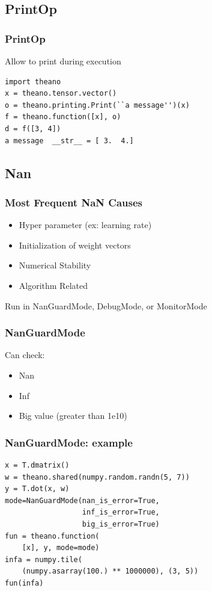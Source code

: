 \documentclass[utf8x,xcolor=pdftex,dvipsnames,table]{beamer}
\begin{document}
\subsection{PrintOp}
\begin{frame}[fragile]
  \frametitle{PrintOp}
Allow to print during execution
\begin{lstlisting}
import theano
x = theano.tensor.vector()
o = theano.printing.Print(``a message'')(x)
f = theano.function([x], o)
d = f([3, 4])
a message  __str__ = [ 3.  4.]
\end{lstlisting}
\end{frame}


\subsection{Nan}
\begin{frame}
  \frametitle{Most Frequent NaN Causes}
\begin{itemize}
\item Hyper parameter (ex: learning rate)
\item Initialization of weight vectors
\item Numerical Stability
\item Algorithm Related
\end{itemize}
Run in NanGuardMode, DebugMode, or MonitorMode
\end{frame}

\begin{frame}[fragile]
  \frametitle{NanGuardMode}
Can check:
\begin{itemize}
\item Nan
\item Inf
\item Big value (greater than 1e10)
\end{itemize}
\end{frame}

\begin{frame}[fragile]
  \frametitle{NanGuardMode: example}
\begin{lstlisting}
x = T.dmatrix()
w = theano.shared(numpy.random.randn(5, 7))
y = T.dot(x, w)
mode=NanGuardMode(nan_is_error=True,
                  inf_is_error=True,
                  big_is_error=True)
fun = theano.function(
    [x], y, mode=mode)
infa = numpy.tile(
    (numpy.asarray(100.) ** 1000000), (3, 5))
fun(infa)
\end{lstlisting}
\end{frame}
\end{document}
